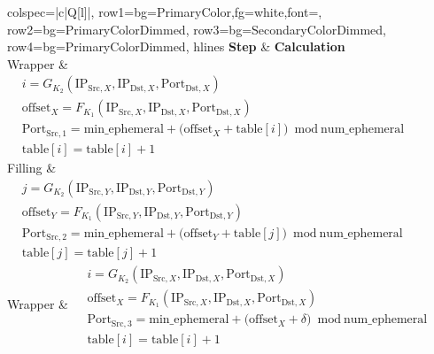 \documentclass[twocolumn]{report}
\begin{document}
\begin{center}
	\begin{adjustbox}{max width=0.95\columnwidth}
		\begin{tblr}{
			colspec={|c|Q[l]|},
			row{1}={bg=PrimaryColor,fg=white,font=\bfseries},
			row{2}={bg=PrimaryColorDimmed},
			row{3}={bg=SecondaryColorDimmed},
			row{4}={bg=PrimaryColorDimmed},
			hlines
			}
			\textbf{Step} & \textbf{Calculation} \\

			Wrapper       &
			\(
			\begin{aligned}
				 & i = G_{K_2}(\text{IP}_{\text{Src},X}, \text{IP}_{\text{Dst},X}, \text{Port}_{\text{Dst},X})                                   \\
				 & \text{offset}_X = F_{K_1}(\text{IP}_{\text{Src},X}, \text{IP}_{\text{Dst},X}, \text{Port}_{\text{Dst},X})                     \\
				 & \text{Port}_{\text{Src},1} = \text{min\_ephemeral} + \bigl(\text{offset}_X + \text{table}[i]\bigr)\bmod \text{num\_ephemeral} \\
				 & \text{table}[i] = \text{table}[i] + 1
			\end{aligned}
			\)                                   \\

			Filling       &
			\(
			\begin{aligned}
				 & j = G_{K_2}(\text{IP}_{\text{Src},Y}, \text{IP}_{\text{Dst},Y}, \text{Port}_{\text{Dst},Y})                                   \\
				 & \text{offset}_Y = F_{K_1}(\text{IP}_{\text{Src},Y}, \text{IP}_{\text{Dst},Y}, \text{Port}_{\text{Dst},Y})                     \\
				 & \text{Port}_{\text{Src},2} = \text{min\_ephemeral} + \bigl(\text{offset}_Y + \text{table}[j]\bigr)\bmod \text{num\_ephemeral} \\
				 & \text{table}[j] = \text{table}[j] + 1
			\end{aligned}
			\)                                   \\

			Wrapper       &
			\(
			\begin{aligned}
				 & i = G_{K_2}(\text{IP}_{\text{Src},X}, \text{IP}_{\text{Dst},X}, \text{Port}_{\text{Dst},X})                                             \\
				 & \text{offset}_X = F_{K_1}(\text{IP}_{\text{Src},X}, \text{IP}_{\text{Dst},X}, \text{Port}_{\text{Dst},X})                               \\
				 & \text{Port}_{\text{Src},3} = \text{min\_ephemeral} + \bigl(\text{offset}_X + \delta \bigr)\bmod \text{num\_ephemeral} \\
				 & \text{table}[i] = \text{table}[i] + 1
			\end{aligned}
			\)                                   \\
		\end{tblr}
	\end{adjustbox}
\end{center}
\end{document}
